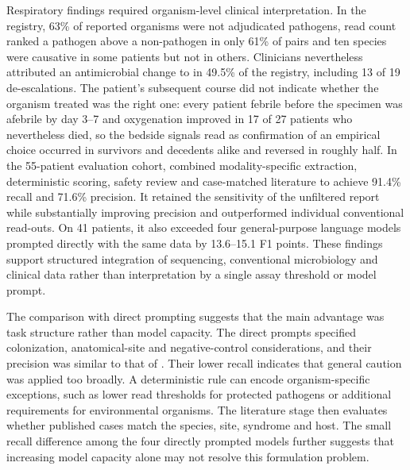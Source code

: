 
Respiratory \mngs findings required organism-level clinical interpretation. In the registry, 63\% of reported organisms were not adjudicated pathogens, read count ranked a pathogen above a non-pathogen in only 61\% of pairs and ten species were causative in some patients but not in others. Clinicians nevertheless attributed an antimicrobial change to \mngs in 49.5\% of the registry, including 13 of 19 de-escalations. The patient's subsequent course did not indicate whether the organism treated was the right one: every \kmuh patient febrile before the specimen was afebrile by day 3--7 and oxygenation improved in 17 of 27 patients who nevertheless died, so the bedside signals read as confirmation of an empirical choice occurred in survivors and decedents alike and reversed in roughly half. In the 55-patient evaluation cohort, \toolname combined modality-specific extraction, deterministic scoring, safety review and case-matched literature to achieve 91.4\% recall and 71.6\% precision. It retained the sensitivity of the unfiltered \mngs report while substantially improving precision and outperformed individual conventional read-outs. On 41 patients, it also exceeded four general-purpose language models prompted directly with the same data by 13.6--15.1 F1 points. These findings support structured integration of sequencing, conventional microbiology and clinical data rather than interpretation by a single assay threshold or model prompt.

The comparison with direct prompting suggests that the main advantage was task structure rather than model capacity. The direct prompts specified colonization, anatomical-site and negative-control considerations, and their precision was similar to that of \toolname. Their lower recall indicates that general caution was applied too broadly. A deterministic rule can encode organism-specific exceptions, such as lower read thresholds for protected pathogens or additional requirements for environmental organisms. The literature stage then evaluates whether published cases match the species, site, syndrome and host.  The small recall difference among the four directly prompted models further suggests that increasing model capacity alone may not resolve this formulation problem.

